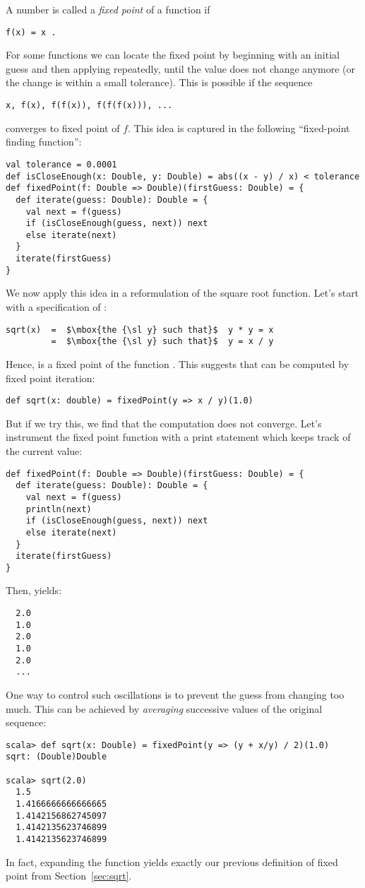 A number  is called a {\em fixed point} of a function  if
\begin{lstlisting}
f(x) = x .
\end{lstlisting}
For some functions  we can locate the fixed point by beginning
with an initial guess and then applying  repeatedly, until the
value does not change anymore (or the change is within a small
tolerance). This is possible if the sequence
\begin{lstlisting}
x, f(x), f(f(x)), f(f(f(x))), ...
\end{lstlisting}
converges to fixed point of $f$. This idea is captured in
the following ``fixed-point finding function'':
\begin{lstlisting}
val tolerance = 0.0001
def isCloseEnough(x: Double, y: Double) = abs((x - y) / x) < tolerance
def fixedPoint(f: Double => Double)(firstGuess: Double) = {
  def iterate(guess: Double): Double = {
    val next = f(guess)
    if (isCloseEnough(guess, next)) next
    else iterate(next)
  }
  iterate(firstGuess)
}
\end{lstlisting}
We now apply this idea in a reformulation of the square root function.
Let's start with a specification of :
\begin{lstlisting}
sqrt(x)  =  $\mbox{the {\sl y} such that}$  y * y = x
         =  $\mbox{the {\sl y} such that}$  y = x / y
\end{lstlisting}
Hence,  is a fixed point of the function .
This suggests that  can be computed by fixed point iteration:
\begin{lstlisting}
def sqrt(x: double) = fixedPoint(y => x / y)(1.0)
\end{lstlisting}
But if we try this, we find that the computation does not
converge. Let's instrument the fixed point function with a print
statement which keeps track of the current  value:
\begin{lstlisting}
def fixedPoint(f: Double => Double)(firstGuess: Double) = {
  def iterate(guess: Double): Double = {
    val next = f(guess)
    println(next)
    if (isCloseEnough(guess, next)) next
    else iterate(next)
  }
  iterate(firstGuess)
}
\end{lstlisting}
Then,  yields:
\begin{lstlisting}
  2.0
  1.0
  2.0
  1.0
  2.0
  ...
\end{lstlisting}
One way to control such oscillations is to prevent the guess from changing too much. 
This can be achieved by {\em averaging} successive values of the original sequence:
\begin{lstlisting}
scala> def sqrt(x: Double) = fixedPoint(y => (y + x/y) / 2)(1.0)
sqrt: (Double)Double

scala> sqrt(2.0)
  1.5
  1.4166666666666665
  1.4142156862745097
  1.4142135623746899
  1.4142135623746899
\end{lstlisting}
In fact, expanding the  function yields exactly our 
previous definition of fixed point from Section~\ref{sec:sqrt}.

